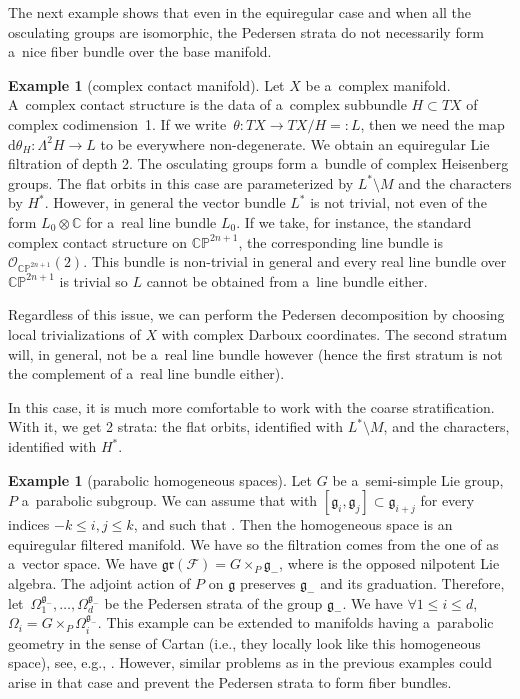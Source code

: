 \documentclass[pdftex]{sigma}
\newcommand{\CC}{\mathbb C} %
\newcommand{\g}{\mathfrak{g}} %
\newcommand{\p}{\mathfrak{p}} %
\newcommand{\Fb}{\mathcal{F}} %
\newcommand{\gr}{\mathfrak{gr}} %
\numberwithin{equation}{section}
\theoremstyle{definition}
\newtheorem{ex}[thm]{Example}
\begin{document}
The next example shows that even in the equiregular case and when all the osculating groups are isomorphic, the Pedersen strata do not necessarily form a~nice fiber bundle over the base manifold.

\begin{ex}[complex contact manifold]
 Let $X$ be a~complex manifold. A~complex contact structure is the data of a~complex subbundle $H\subset TX$ of complex codimension~1. If we write~${\theta \colon TX \to {TX}/{H}=:L}$, then we need the map $\mathrm{d}\theta_H \colon \Lambda^2H \to L$ to be everywhere non-degenerate. We obtain an equiregular Lie filtration of depth 2. The osculating groups form a~bundle of complex Heisenberg groups. The flat orbits in this case are parameterized by $L^*\setminus M$ and the characters by $H^*$. However, in general the vector bundle $L^*$ is not trivial, not even of the form $L_0\otimes \CC$ for a~real line bundle $L_0$. If we take, for instance, the standard complex contact structure on $\mathbb{CP}^{2n+1}$, the corresponding line bundle is $\mathcal{O}_{\mathbb{CP}^{2n+1}}(2)$. This bundle is non-trivial in general and every real line bundle over $\mathbb{CP}^{2n+1}$ is trivial so $L$ cannot be obtained from a~line bundle either.

 Regardless of this issue, we can perform the Pedersen decomposition by choosing local trivializations of $X$ with complex Darboux coordinates. The second stratum will, in general, not be a~real line bundle however (hence the first stratum is not the complement of a~real line bundle either).

 In this case, it is much more comfortable to work with the coarse stratification. With it, we get 2 strata: the flat orbits, identified with $L^*\setminus M$, and the characters, identified with $H^*$.
\end{ex}

\begin{ex}[parabolic homogeneous spaces]
 Let $G$ be a~semi-simple Lie group, $P$ a~parabolic subgroup. We can assume that \smash{$\g = \bigoplus_{j = -k}^k \g_j$} with $[\g_i,\g_j] \subset \g_{i+j}$ for every indices $-{k\leq i,j\leq k}$, and such that \smash{$\p = \bigoplus_{j = 0}^k\g_j$}. Then the homogeneous space  is an equiregular filtered manifold. We have \smash{$T({G}/{P}) = G \times_P {\g}/{\p}$} so the filtration comes from the one of \smash{${\g}/{\p}$} as a~vector space. We have $\gr(\Fb) = G\times_P \g_-$, where \smash{$\g_- = \bigoplus_{j = -k}^{-1}\g_j$} is the opposed nilpotent Lie algebra. The adjoint action of $P$ on $\g$ preserves $\g_-$ and its graduation. Therefore, let~${\Omega_1^{\g_-}, \dots, \Omega_d^{\g_-}}$ be the Pedersen strata of the group $\g_-$. We have $\forall 1\leq i \leq d$, $ \Omega_i = G \times_P \Omega_i^{\g_-}$.
 This example can be extended to manifolds having a~parabolic geometry in the sense of Cartan (i.e., they locally look like this homogeneous space), see, e.g., \cite{DaveHallerBGG}. However, similar problems as in the previous examples could arise in that case and prevent the Pedersen strata to form fiber bundles.
\end{ex}
\end{document}

